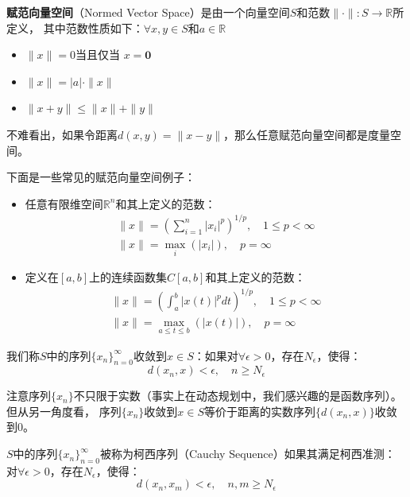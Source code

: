 \begin{definition}
    \textbf{赋范向量空间}（Normed Vector Space）是由一个向量空间$S$和范数$\| \cdot \|: S \rightarrow \mathbb{R}$所定义，
    其中范数性质如下：$\forall x,y \in S$和$a \in \mathbb{R}$
    \begin{itemize}
        \item \( \|x\| = 0 \)当且仅当 \(x=\mathbf{0}\)
        \item $\|x\|=|a|\cdot \|x\|$
        \item $\|x+y\| \leq \|x\|+\|y\|$
    \end{itemize}
\end{definition}
不难看出，如果令距离$d\left(x,y\right)=\|x-y\|$，那么任意赋范向量空间都是度量空间。
\begin{example}
    下面是一些常见的赋范向量空间例子：
    \begin{itemize}
        \item 任意有限维空间$\mathbb{R}^n$和其上定义的范数：
            \begin{gather*}
                \|x\|=\left(\sum_{i=1}^{n}|x_i|^p\right)^{1/p}, \quad 1\leq p < \infty \\
                \|x\|=\max_{i}\left(|x_i|\right), \quad p=\infty
            \end{gather*}

        \item 定义在$\left[a,b\right]$上的连续函数集$C\left[a,b\right]$和其上定义的范数：     
            \begin{gather*}
                \|x\|=\left(\int_{a}^{b}|x\left(t\right)|^{p}dt\right)^{1/p}, \quad 1 \leq p < \infty \\
                \|x\|=\max _{a\leq t \leq b}\left(|x\left(t\right)|\right), \quad p = \infty
            \end{gather*}
    \end{itemize}
\end{example}

\begin{definition}
    我们称$S$中的序列$\{x_n\}_{n=0}^{\infty}$收敛到$x \in S$：如果对$\forall \epsilon > 0$，存在$N_{\epsilon}$，使得：
    $$d\left(x_n,x\right)<\epsilon, \quad n\geq N_{\epsilon}$$
\end{definition}
注意序列$\{x_n\}$不只限于实数（事实上在动态规划中，我们感兴趣的是函数序列）。但从另一角度看，
序列$\{x_n\}$收敛到$x \in S$等价于距离的实数序列$\{d\left(x_n,x\right)\}$收敛到0。

\begin{definition}
    $S$中的序列$\{x_n\}_{n=0}^{\infty}$被称为柯西序列（Cauchy Sequence）如果其满足柯西准测：
    对$\forall \epsilon > 0$，存在$N_{\epsilon}$，使得：
    $$d\left(x_n,x_m\right) < \epsilon, \quad n,m \geq N_{\epsilon}$$
\end{definition}

